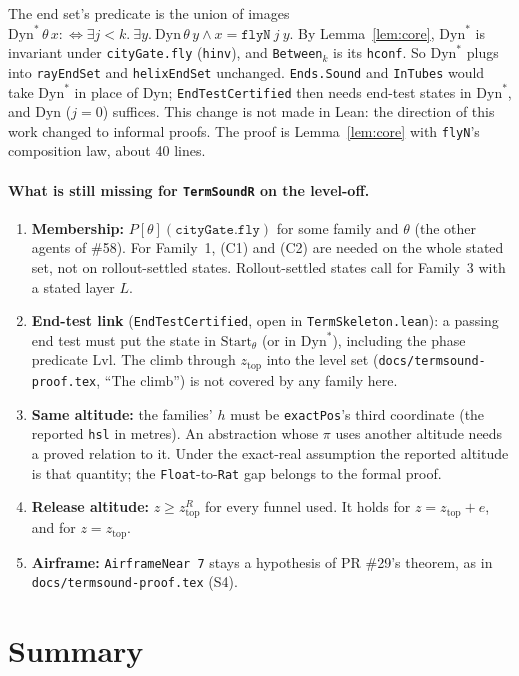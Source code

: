 \documentclass[11pt]{article}
\theoremstyle{definition}
\newcommand{\Dyn}{\ensuremath{\mathrm{Dyn}}}
\newcommand{\Start}{\ensuremath{\mathrm{Start}}}
\newcommand{\zTop}{z_{\mathrm{top}}}
\begin{document}
The end set's predicate is the union of images $\Dyn^*\,\theta\,x :\iff \exists j < k.\ \exists y.\ \Dyn\,\theta\,y \wedge x = \texttt{flyN}\ j\ y$. By Lemma~\ref{lem:core}, $\Dyn^*$ is invariant under \texttt{cityGate.fly} (\texttt{hinv}), and \texttt{Between}$_k$ is its \texttt{hconf}. So $\Dyn^*$ plugs into \texttt{rayEndSet} and \texttt{helixEndSet} unchanged. \texttt{Ends.Sound} and \texttt{InTubes} would take $\Dyn^*$ in place of $\Dyn$; \texttt{EndTestCertified} then needs end-test states in $\Dyn^*$, and $\Dyn$ ($j = 0$) suffices. This change is not made in Lean: the direction of this work changed to informal proofs. The proof is Lemma~\ref{lem:core} with \texttt{flyN}'s composition law, about 40 lines.

\paragraph{What is still missing for \texttt{TermSoundR} on the level-off.}
\begin{enumerate}
\item \textbf{Membership:} $P[\theta](\texttt{cityGate.fly})$ for some family and $\theta$ (the other agents of \#58). For Family~1, (C1) and (C2) are needed on the whole stated set, not on rollout-settled states. Rollout-settled states call for Family~3 with a stated layer $L$.
\item \textbf{End-test link} (\texttt{EndTestCertified}, open in \texttt{TermSkeleton.lean}): a passing end test must put the state in $\Start_\theta$ (or in $\Dyn^*$), including the phase predicate $\mathrm{Lvl}$. The climb through $\zTop$ into the level set (\texttt{docs/termsound-proof.tex}, ``The climb'') is not covered by any family here.
\item \textbf{Same altitude:} the families' $h$ must be \texttt{exactPos}'s third coordinate (the reported \texttt{hsl} in metres). An abstraction whose $\pi$ uses another altitude needs a proved relation to it. Under the exact-real assumption the reported altitude is that quantity; the \texttt{Float}-to-\texttt{Rat} gap belongs to the formal proof.
\item \textbf{Release altitude:} $z \ge \zTop^R$ for every funnel used. It holds for $z = \zTop + e$, and for $z = \zTop$.
\item \textbf{Airframe:} \texttt{AirframeNear 7} stays a hypothesis of PR \#29's theorem, as in \texttt{docs/termsound-proof.tex} (S4).
\end{enumerate}

\section{Summary}\label{sec:summary}
\end{document}
